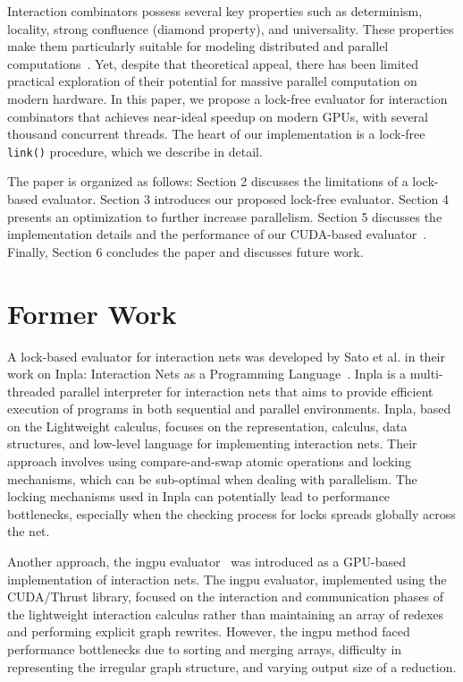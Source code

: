\documentclass{article}
\begin{document}
Interaction combinators possess several key properties such as determinism, locality, strong confluence (diamond property), and universality. These properties make them particularly suitable for modeling distributed and parallel computations~\cite{lafont1997interaction}. Yet, despite that theoretical appeal, there has been limited practical exploration of their potential for massive parallel computation on modern hardware. In this paper, we propose a lock-free evaluator for interaction combinators that achieves near-ideal speedup on modern GPUs, with several thousand concurrent threads. The heart of our implementation is a lock-free \texttt{link()} procedure, which we describe in detail.

The paper is organized as follows: Section 2 discusses the limitations of a lock-based evaluator. Section 3 introduces our proposed lock-free evaluator. Section 4 presents an optimization to further increase parallelism. Section 5 discusses the implementation details and the performance of our CUDA-based evaluator~\cite{taelin2022lock}. Finally, Section 6 concludes the paper and discusses future work.

\section{Former Work}\label{s:former_work}


A lock-based evaluator for interaction nets was developed by Sato et al. in their work on Inpla: Interaction Nets as a Programming Language~\cite{hassan2010implementation, sato2014implementation}. Inpla is a multi-threaded parallel interpreter for interaction nets that aims to provide efficient execution of programs in both sequential and parallel environments. Inpla, based on the Lightweight calculus, focuses on the representation, calculus, data structures, and low-level language for implementing interaction nets. Their approach involves using compare-and-swap atomic operations and locking mechanisms, which can be sub-optimal when dealing with parallelism. The locking mechanisms used in Inpla can potentially lead to performance bottlenecks, especially when the checking process for locks spreads globally across the net.

Another approach, the ingpu evaluator~\cite{jiresch2014towards} was introduced as a GPU-based implementation of interaction nets. The ingpu evaluator, implemented using the CUDA/Thrust library, focused on the interaction and communication phases of the lightweight interaction calculus rather than maintaining an array of redexes and performing explicit graph rewrites. However, the ingpu method faced performance bottlenecks due to sorting and merging arrays, difficulty in representing the irregular graph structure, and varying output size of a reduction.
\end{document}
